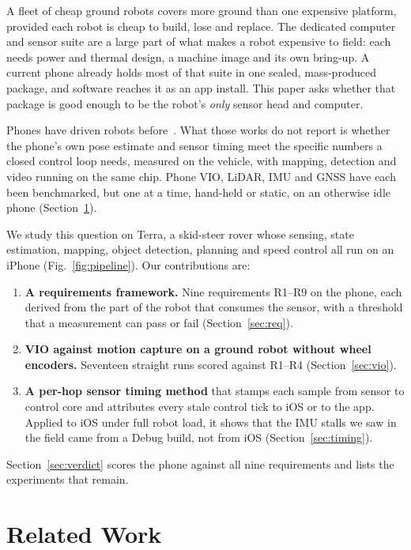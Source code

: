 \documentclass[conference]{IEEEtran}
\begin{document}
A fleet of cheap ground robots covers more ground than one expensive platform, provided each robot is cheap to build, lose and replace.
The dedicated computer and sensor suite are a large part of what makes a robot expensive to field: each needs power and thermal design, a machine image and its own bring-up.
A current phone already holds most of that suite in one sealed, mass-produced package, and software reaches it as an app install.
This paper asks whether that package is good enough to be the robot's \emph{only} sensor head and computer.

Phones have driven robots before~\cite{oros2013smartphone,fong2013smartspheres,muller2021openbot}.
What those works do not report is whether the phone's own pose estimate and sensor timing meet the specific numbers a closed control loop needs, measured on the vehicle, with mapping, detection and video running on the same chip.
Phone VIO, LiDAR, IMU and GNSS have each been benchmarked, but one at a time, hand-held or static, on an otherwise idle phone (Section~\ref{sec:related}).

We study this question on Terra, a skid-steer rover whose sensing, state estimation, mapping, object detection, planning and speed control all run on an iPhone (Fig.~\ref{fig:pipeline}).
Our contributions are:
\begin{enumerate}
\item \textbf{A requirements framework.} Nine requirements R1--R9 on the phone, each derived from the part of the robot that consumes the sensor, with a threshold that a measurement can pass or fail (Section~\ref{sec:req}).
\item \textbf{VIO against motion capture on a ground robot without wheel encoders.} Seventeen straight runs scored against R1--R4 (Section~\ref{sec:vio}).
\item \textbf{A per-hop sensor timing method} that stamps each sample from sensor to control core and attributes every stale control tick to iOS or to the app. Applied to iOS under full robot load, it shows that the IMU stalls we saw in the field came from a Debug build, not from iOS (Section~\ref{sec:timing}).
\end{enumerate}
Section~\ref{sec:verdict} scores the phone against all nine requirements and lists the experiments that remain.

\section{Related Work}
\label{sec:related}
\end{document}
